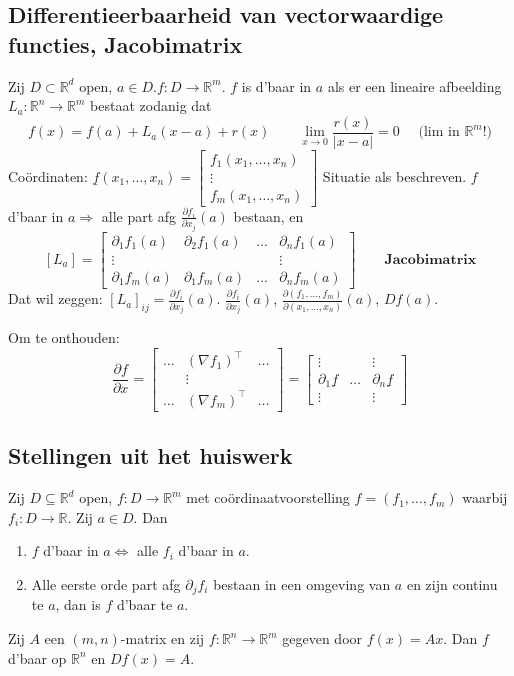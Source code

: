 \documentclass[a4paper]{exam}
\theoremstyle{definition}
\newcommand{\reals}{\mathbb{R}}
\begin{document}
		\subsection{Differentieerbaarheid van vectorwaardige functies, Jacobimatrix}
			Zij $D \subset \reals^d$ open, $a \in D. f: D \rightarrow \reals^m$. $f$ is d'baar in $a$ als er een lineaire afbeelding $L_a :\reals^n \rightarrow \reals^m$ bestaat zodanig dat \[f(x)=f(a)+L_a (x-a) + r(x) \qquad \lim_{x \rightarrow 0} \frac{r(x)}{|x-a|} =0 \quad\text{ (lim in } \reals^m \text{!)}\]
			Co\"ordinaten: $\underline{f}(x_1,\dots ,x_n)=\begin{bmatrix}
				f_1 (x_1, \dots ,x_n) \\
				\vdots \\
				f_m (x_1, \dots ,x_n)
			\end{bmatrix}$
			\theorem[en definitie] Situatie als beschreven. $f$ d'baar in $a \Rightarrow$ alle part afg $\frac{\partial f_i}{\partial x_j}(a)$ bestaan, en
			\[[L_a] = \begin{bmatrix}
				\partial_1 f_1 (a) & \partial_2 f_1 (a) & \dots &\partial_n f_1 (a) \\
				\vdots & & & \vdots \\
				\partial_1 f_m (a) & \partial_1 f_m (a) & \dots &\partial_n f_m (a)
			\end{bmatrix} \qquad \textbf{Jacobimatrix}\]
			Dat wil zeggen: $[L_a]_{ij}=\frac{\partial f_i}{\partial x_j}(a)$.
			\nota $\frac{\partial f_i}{\partial x_j}(a)$, $\frac{\partial (f_1,\dots,f_m)}{\partial (x_1,\dots,x_n)}(a)$, $ Df(a) $.
			
			Om te onthouden:
			\[ \frac{\partial f}{\partial x} = \begin{bmatrix}
			\dots & (\nabla f_1)^\top & \dots \\
			& \vdots & \\
			\dots & (\nabla f_m)^\top & \dots
			\end{bmatrix} =
			\begin{bmatrix}
			\vdots & & \vdots \\
			\partial_1 \underline{f} & \dots & \partial_n \underline{f} \\
			\vdots & & \vdots
			\end{bmatrix}\]
			
		\subsection{Stellingen uit het huiswerk}
			\theorem Zij $ D \subseteq \reals^d $ open, $ f: D \rightarrow \reals^m $ met co\"ordinaatvoorstelling $ f=(f_1,\dots,f_m) $ waarbij $ f_i : D \rightarrow \reals $. Zij $ a \in D $. Dan
			\begin{enumerate}[(1)]
				\item $ f $ d'baar in $ a \Leftrightarrow $ alle $ f_i $ d'baar in $ a $.
				\item Alle eerste orde part afg $ \partial_j f_i $ bestaan in een omgeving van $ a $ en zijn continu te $ a $, dan is $ f $ d'baar te $ a $.
			\end{enumerate}
			\theorem Zij $ A $ een $ (m,n) $-matrix en zij $ f:\reals^n \rightarrow \reals^m $ gegeven door $ f(x)=Ax $. Dan $ f $ d'baar op $ \reals^n $ en $ Df(x) = A $.
			
\end{document}
